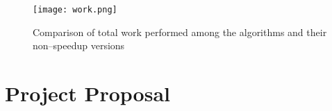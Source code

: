 \documentclass[12pt,a4paper,oneside,openright]{report}
\begin{document}
\begin{appendices}
\begin{figure}
\centering \texttt{[image: work.png]}
\caption{Comparison of total work performed among the algorithms and their non--speedup versions}
\end{figure}







\end{appendices}
\chapter*{Project Proposal}
%
\end{document}
